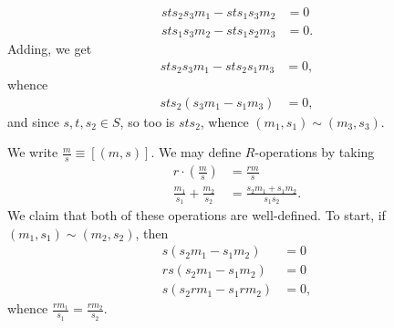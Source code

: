 \documentclass[10pt]{mypackage}
\begin{document}
\begin{solution}
\begin{enumerate}[(a)]
\begin{itemize}
\begin{align*}
            sts_2s_3m_1 - sts_1s_3m_2 &= 0\\
            sts_1s_3m_2 - sts_1s_2m_3 &= 0.
          \end{align*}
          Adding, we get
          \begin{align*}
            sts_2s_3m_1 - sts_2s_1m_3 &= 0,
          \end{align*}
          whence
          \begin{align*}
            sts_2\left( s_3m_1 - s_1m_3 \right) &= 0,
          \end{align*}
          and since $s,t,s_2\in S$, so too is $sts_2$, whence $\left( m_1,s_1 \right)\sim \left( m_3,s_3 \right)$.
      \end{itemize}
      We write $\frac{m}{s}\equiv \left[ \left( m,s \right) \right]$. We may define $R$-operations by taking
      \begin{align*}
        r\cdot \left( \frac{m}{s} \right) &= \frac{rm}{s}\\
        \frac{m_1}{s_1} + \frac{m_2}{s_2} &= \frac{s_2m_1 + s_1m_2}{s_1s_2}.
      \end{align*}
      We claim that both of these operations are well-defined. To start, if $\left( m_1,s_1 \right)\sim \left( m_2,s_2 \right)$, then
      \begin{align*}
        s\left( s_2m_1 - s_1m_2 \right) &= 0\\
        rs\left( s_2m_1 - s_1m_2 \right) &= 0\\
        s\left( s_2rm_1 - s_1rm_2 \right) &= 0,
      \end{align*}
      whence $\frac{rm_1}{s_1} = \frac{rm_2}{s_2}$.\newline


\end{enumerate}
\end{solution}
\end{document}
